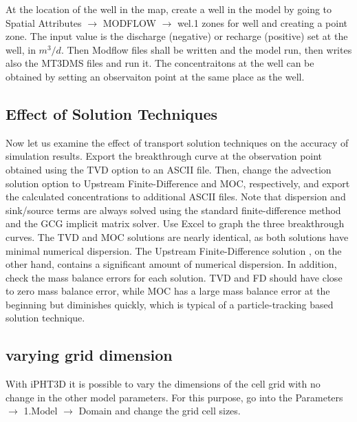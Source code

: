 At the location of the well in the map, create a well in the model by going to 
Spatial Attributes $\rightarrow$ MODFLOW $\rightarrow$ wel.1 zones for well and creating a point zone. 
The input value is the discharge (negative) or recharge (positive) set at the well, in $m^3/d$.
Then Modflow files shall be written and the model run, then writes also the MT3DMS files and run it.
The concentraitons at the well can be obtained by setting an observaiton point at the same place as the well.


\subsection{Effect of Solution Techniques}

Now let us examine the effect of transport solution techniques on the accuracy of
simulation results. Export the breakthrough curve at the observation point obtained using
the TVD option to an ASCII file. Then, change the advection solution option to
Upstream Finite-Difference and MOC, respectively, and export the calculated
concentrations to additional ASCII files. Note that dispersion and sink/source terms are
always solved using the standard finite-difference method and the GCG implicit matrix
solver.
Use Excel to graph the three breakthrough curves. 
The TVD 
and MOC 
solutions are
nearly identical, as both solutions have minimal numerical dispersion. The Upstream
Finite-Difference solution 
, on the other hand, contains a significant
amount of numerical dispersion.
In addition, check the mass balance errors for each solution. TVD and FD should have
close to zero mass balance error, while MOC has a large mass balance error at the
beginning but diminishes quickly, which is typical of a particle-tracking based solution
technique.

\subsection{varying grid dimension}
With iPHT3D it is possible to vary the dimensions of the cell grid with no change in the other model parameters.
For this purpose, go into the Parameters $\rightarrow$ 1.Model $\rightarrow$ Domain and change the grid cell sizes.